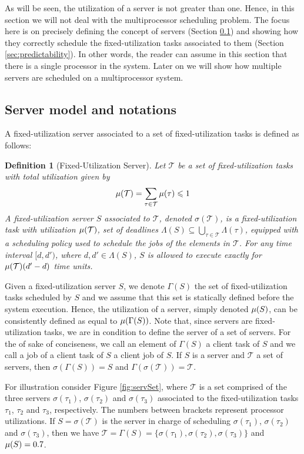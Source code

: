 \documentclass[twocolumn, compsocconf]{IEEEtran}
\newtheorem{definition}{Definition}[section]
\newcommand{\serv}{\ensuremath{\sigma}}
\newcommand{\clientOf}{\ensuremath{\Gamma}\xspace}
\newcommand{\futSet}{\ensuremath{\mathcal{T}}\xspace}
\newcommand{\servSet}{\ensuremath{\mathcal{T}}}
\newcounter{proc}
\begin{document}
As will be seen, the utilization of a server is not greater than one. Hence, in
this section we will not deal with the multiprocessor scheduling problem. The
focus here is on precisely defining the concept of servers (Section
\ref{sec:serverModel}) and showing how they correctly schedule the
fixed-utilization tasks associated to them (Section
\ref{sec:predictability}). In other words, the reader can assume in this section
that there is a single processor in the system. Later on we will show how
multiple servers are scheduled on a multiprocessor system.

\subsection{Server model and notations}
\label{sec:serverModel}

A fixed-utilization server associated to a set of fixed-utilization tasks is
defined as follows:


\begin{definition}[Fixed-Utilization Server]\label{dfn:server}
  Let $\futSet$ be a set of fixed-utilization tasks with total utilization given
  by
  \[
  \util(\futSet) = \sum_{\tau \in \futSet} \util(\tau) \leqslant 1
  \]
  A fixed-utilization server $S$ associated to $\futSet$, denoted
  $\serv(\servSet)$, is a fixed-utilization task with utilization
  $\util(\futSet)$, set of deadlines $\Lambda(S) \subseteq \bigcup_{\tau \in
    \futSet} \Lambda(\tau)$, equipped with a scheduling policy used to schedule
  the jobs of the elements in $\futSet$. For any time interval $[d,d')$, where
  $d,d' \in \Lambda(S)$, $S$ is allowed to execute exactly for
  $\util(\futSet)(d'-d)$ time units.
\end{definition}

Given a fixed-utilization server $S$, we denote $\clientOf(S)$ the set of
fixed-utilization tasks scheduled by $S$ and we assume that this set is
statically defined before the system execution. Hence, the utilization of a
server, simply denoted $\mu(S)$, can be consistently defined as equal to
$\util(\clientOf(S))$. Note that, since servers are fixed-utilization tasks, we
are in condition to define the server of a set of servers. For the of sake of
conciseness, we call an element of $\clientOf(S)$ a client task of $S$ and we
call a job of a client task of $S$ a client job of $S$.  If $S$ is a server and
$\servSet$ a set of servers, then $\serv(\clientOf(S)) = S$ and
$\clientOf(\serv(\servSet)) = \servSet$.

For illustration consider Figure \ref{fig:servSet}, where $\servSet$ is a set
comprised of the three servers $\serv(\tau_1)$, $\serv(\tau_2)$ and
$\serv(\tau_3)$ associated to the fixed-utilization tasks $\tau_1$, $\tau_2$ and
$\tau_3$, respectively. The numbers between brackets represent processor
utilizations. If $S = \serv(\servSet)$ is the server in charge of scheduling
$\serv(\tau_1)$, $\serv(\tau_2)$ and $\serv(\tau_3)$, then we have $\servSet =
\clientOf(S) = \{\serv(\tau_1), \serv(\tau_2), \serv(\tau_3) \}$ and $\mu(S) =
0.7$.
\end{document}
